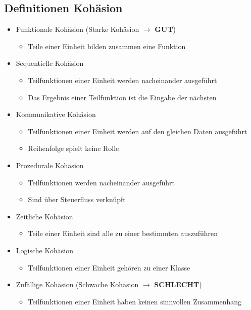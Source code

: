 \begin{multicols}{2}
\subsection{Definitionen Kohäsion}
\begin{itemize}
  \item Funktionale Kohäsion (Starke Kohäsion $\rightarrow$ \textbf{GUT})
  \begin{itemize}
    \item Teile einer Einheit bilden zusammen eine Funktion 
  \end{itemize}
  \item Sequentielle Kohäsion
   \begin{itemize}
    \item Teilfunktionen einer Einheit werden nacheinander ausgeführt
    \item Das Ergebnis einer Teilfunktion ist die Eingabe der nächsten
  \end{itemize}
  \item Kommunikative Kohäsion
  \begin{itemize}
    \item Teilfunktionen einer Einheit werden auf den gleichen Daten ausgeführt
    \item Reihenfolge spielt keine Rolle
  \end{itemize}
  \item Prozedurale Kohäsion
  \begin{itemize}
    \item Teilfunktionen werden nacheinander ausgeführt
    \item Sind über Steuerfluss verknüpft
  \end{itemize}
  \item Zeitliche Kohäsion
  \begin{itemize}
    \item Teile einer Einheit sind alle zu einer bestimmten auszuführen
  \end{itemize}
  \item Logische Kohäsion
  \begin{itemize}
    \item Teilfunktionen einer Einheit gehören zu einer Klasse
  \end{itemize}
  \item Zufällige Kohäsion (Schwache Kohäsion $\rightarrow$ \textbf{SCHLECHT})
  \begin{itemize}
    \item Teilfunktionen einer Einheit haben keinen sinnvollen Zusammenhang
  \end{itemize}
\end{itemize}
\end{multicols}
